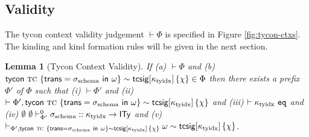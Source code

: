 \documentclass[12pt]{article}
\newtheorem{lemma}{Lemma}
\begin{document}
\subsection{Validity}

The tycon context validity judgement $\vdash \Phi$ is specified in Figure \ref{fig:tycon-ctxs}. The kinding and kind formation rules will be given in the next section.



\begin{lemma}[Tycon Context Validity]
\label{lemma:tycon-context-validity}
If (a) $\vdash \Phi$ and (b) ${\sf tycon}~\textsc{tc} ~\{{\sf trans}=\sigma_\text{schema}~{\sf in}~\omega\} \sim {\sf tcsig}[\kappa_\text{tyidx}]\,\{\chi\} \in \Phi$ then there exists a prefix $\Phi'$ of $\Phi$ such that (i) $\vdash \Phi'$ and (ii) $\vdash \Phi', {\sf tycon}~\textsc{tc} ~\{{\sf trans}=\sigma_\text{schema}~{\sf in}~\omega\} \sim {\sf tcsig}[\kappa_\text{tyidx}]\,\{\chi\}$ and (iii) $\vdash \kappa_\text{tyidx}~\mathtt{eq}$ and (iv) $\emptyset~\emptyset \vdash_{\Phi'}^{0} \sigma_\text{schema} :: \kappa_\text{tyidx} \rightarrow {\sf ITy}$ and (v) $\vdash_{\Phi',  {\sf tycon}~\textsc{tc} ~\{{\sf trans}=\sigma_\text{schema}~{\sf in}~\omega\} \sim {\sf tcsig}[\kappa_\text{tyidx}]\,\{\chi\}} \omega \sim {\sf tcsig}[\kappa_\text{tyidx}]\,\{\chi\}$.
\end{lemma}
\end{document}

